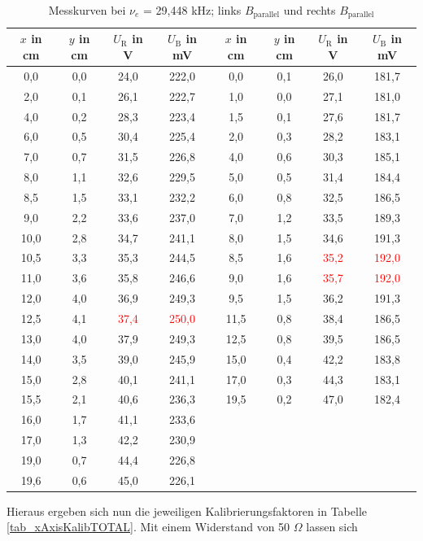 \begin{table}[H]
 \begin{tabular}{c|c|c|c||c|c|c|c}
  $x$ in cm & $y$ in cm & $U_\text{R}$ in V & $U_\text{B} $ in mV & $x$ in cm & $y$ in cm & $U_\text{R}$ in V & $U_\text{B}$ in mV \\
 \hline
0,0 &	0,0&	24,0&	222,0&	0,0&	0,1&	26,0&	181,7\\
2,0&	0,1&	26,1&	222,7&	1,0&	0,0&	27,1&	181,0\\
4,0&	0,2&	28,3&	223,4&	1,5&	0,1&	27,6&	181,7\\
6,0&	0,5&	30,4&	225,4&	2,0&	0,3&	28,2&	183,1\\
7,0&	0,7&	31,5&	226,8&	4,0&	0,6&	30,3&	185,1\\
8,0&	1,1&	32,6&	229,5&	5,0&	0,5&	31,4&	184,4\\
8,5&	1,5&	33,1&	232,2&	6,0&	0,8&	32,5&	186,5\\
9,0&	2,2&	33,6&	237,0&	7,0&	1,2&	33,5&	189,3\\
10,0&	2,8&	34,7&	241,1&	8,0&	1,5&	34,6&	191,3\\
10,5&	3,3&	35,3&	244,5&	8,5&	1,6&	\textcolor{red}{35,2}&	\textcolor{red}{192,0}\\
11,0&	3,6&	35,8&	246,6&	9,0&	1,6&	\textcolor{red}{35,7}&	\textcolor{red}{192,0}\\
12,0&	4,0&	36,9&	249,3&	9,5&	1,5&	36,2&	191,3\\
12,5&	4,1&	\textcolor{red}{37,4}&	\textcolor{red}{250,0}&	11,5&	0,8&	38,4&	186,5\\
13,0&	4,0&	37,9&	249,3&	12,5&	0,8&	39,5&	186,5\\
14,0&	3,5&	39,0&	245,9&	15,0&	0,4&	42,2&	183,8\\
15,0&	2,8&	40,1&	241,1&	17,0&	0,3&	44,3&	183,1\\
15,5&	2,1&	40,6&	236,3&	19,5&	0,2&	47,0&	182,4\\
16,0&	1,7&	41,1&	233,6&	&	&	&	\\
17,0&	1,3&	42,2&	230,9&	&	&	&	\\
19,0&	0,7&	44,4&	226,8&	&	&	&	\\
19,6&	0,6&	45,0&	226,1&	&	&	&	\\

 \end{tabular}
 \caption{Messkurven bei $\nu_e$ = 29,448 kHz; links $B_\text{parallel}$ und rechts $B_\text{parallel}$}
 \label{tab_xAxisKalib30MHz}
\end{table}
Hieraus ergeben sich nun die jeweiligen Kalibrierungsfaktoren in Tabelle \ref{tab_xAxisKalibTOTAL}. Mit einem Widerstand von 50 $\Omega$ lassen sich
